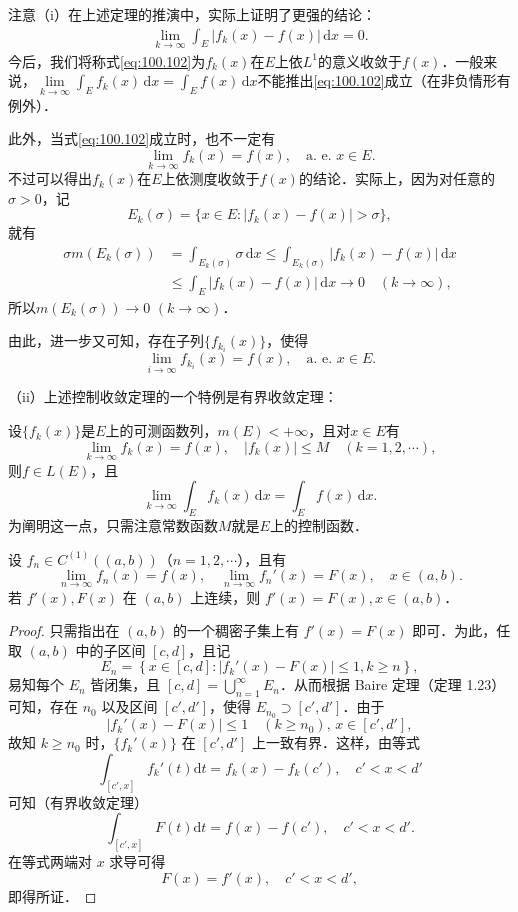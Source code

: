 \documentclass[../../main.tex]{subfiles}%
\begin{document}
\begin{remark}
注意（i）在上述定理的推演中，实际上证明了更强的结论：
\begin{align}
\lim_{k \to \infty} \int_E |f_k(x) - f(x)| \, \mathrm{d}x = 0. \label{eq:100.102}
\end{align}
今后，我们将称式\eqref{eq:100.102}为\(f_k(x)\)在\(E\)上依\(L^1\)的意义收敛于\(f(x)\)．一般来说，$\underset{k\rightarrow \infty}{\lim}\int_E{f_k(x)\,\mathrm{d}x}=\int_E{f(x)\,\mathrm{d}x}$不能推出\eqref{eq:100.102}成立（在非负情形有例外）．

此外，当式\eqref{eq:100.102}成立时，也不一定有
\[
\lim_{k \to \infty} f_k(x) = f(x), \quad \text{a. e. } x \in E.
\]
不过可以得出\(f_k(x)\)在\(E\)上依测度收敛于\(f(x)\)的结论．实际上，因为对任意的\(\sigma > 0\)，记
\[
E_k(\sigma) = \{ x \in E : |f_k(x) - f(x)| > \sigma \},
\]
就有
\begin{align*}
\sigma m(E_k(\sigma)) &= \int_{E_k(\sigma)} \sigma \, \mathrm{d}x \leqslant \int_{E_k(\sigma)} |f_k(x) - f(x)| \, \mathrm{d}x \\
&\leqslant \int_E |f_k(x) - f(x)| \, \mathrm{d}x \to 0 \quad (k \to \infty),
\end{align*}
所以\(m(E_k(\sigma)) \to 0\) \((k \to \infty)\)．

由此，进一步又可知，存在子列\(\{ f_{k_i}(x) \}\)，使得
\[
\lim_{i \to \infty} f_{k_i}(x) = f(x), \quad \text{a. e. } x \in E.
\]

（ii）上述控制收敛定理的一个特例是有界收敛定理：

设\(\{ f_k(x) \}\)是\(E\)上的可测函数列，\(m(E) < +\infty\)，且对\(x \in E\)有
\[
\lim_{k \to \infty} f_k(x) = f(x), \quad |f_k(x)| \leqslant M \quad (k = 1, 2, \cdots),
\]
则\(f \in L(E)\)，且
\[
\lim_{k \to \infty} \int_E f_k(x) \, \mathrm{d}x = \int_E f(x) \, \mathrm{d}x.
\]
为阐明这一点，只需注意常数函数\(M\)就是\(E\)上的控制函数．
\end{remark}

\begin{example}
设 \( f_n \in C^{(1)}((a,b)) \)（\( n = 1,2,\cdots \)），且有
\[
\lim_{n \to \infty} f_n(x) = f(x), \quad \lim_{n \to \infty} f_n'(x) = F(x), \quad x \in (a,b).
\]
若 \( f'(x), F(x) \) 在 \( (a,b) \) 上连续，则 \( f'(x) = F(x), x \in (a,b) \)．
\end{example}
\begin{proof}

只需指出在 \( (a,b) \) 的一个稠密子集上有 \( f'(x) = F(x) \) 即可．为此，任取 \( (a,b) \) 中的子区间 \( [c,d] \)，且记
\[
E_n = \left\{ x \in [c,d] : |f_k'(x) - F(x)| \leqslant 1, k \geqslant n \right\},
\]
易知每个 \( E_n \) 皆闭集，且 \( [c,d] = \bigcup_{n=1}^{\infty} E_n \)．从而根据 Baire 定理（定理 1.23）可知，存在 \( n_0 \) 以及区间 \( [c',d'] \)，使得 \( E_{n_0} \supset [c',d'] \)．由于
\[
|f_k'(x) - F(x)| \leqslant 1 \quad (k \geqslant n_0), \, x \in [c',d'],
\]
故知 \( k \geqslant n_0 \) 时，\( \{ f_k'(x) \} \) 在 \( [c',d'] \) 上一致有界．这样，由等式
\[
\int_{[c',x]} f_k'(t) \mathrm{d}t = f_k(x) - f_k(c'), \quad c' < x < d'
\]
可知（有界收敛定理）
\[
\int_{[c',x]} F(t) \mathrm{d}t = f(x) - f(c'), \quad c' < x < d'.
\]
在等式两端对 \( x \) 求导可得
\[
F(x) = f'(x), \quad c' < x < d',
\]
即得所证．

\end{proof}
\end{document}
